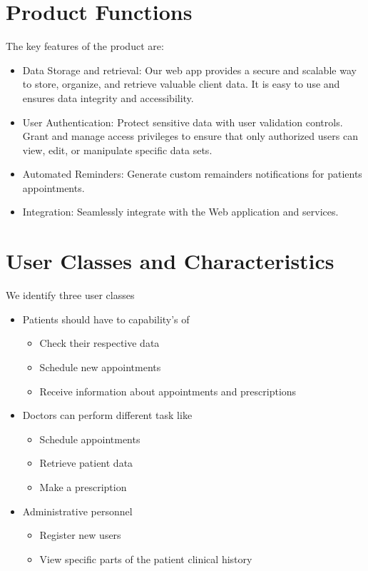 \documentclass{scrreprt}
\begin{document}
	
	\section{Product Functions}
	
	The key features of the product are:
	\begin{itemize}
		\item	Data Storage and retrieval: Our web app provides a secure and scalable way to store, organize, and retrieve valuable client data. It is easy to use and ensures data integrity and accessibility.
		\item	User Authentication: Protect sensitive data with user validation controls. Grant and manage access privileges to ensure that only authorized users can view, edit, or manipulate specific data sets.
		\item Automated Reminders: Generate custom remainders notifications for patients appointments.
		\item Integration: Seamlessly integrate with the Web application and services.
	\end{itemize}
	
	
	\section{User Classes and Characteristics}
	We identify three user classes
	\begin{itemize}
		\item Patients should have to capability's of 
		\begin{itemize}
			\item Check their respective data
			\item Schedule new appointments
			\item Receive information about appointments and prescriptions
		\end{itemize}
		\item Doctors can perform different task like
		\begin{itemize}
			\item Schedule appointments
			\item Retrieve patient data
			\item Make a prescription 
		\end{itemize}
		\item Administrative personnel
		\begin{itemize}
			\item Register new users
			\item View specific parts of the patient clinical history
		\end{itemize}
	\end{itemize}
	
\end{document}
